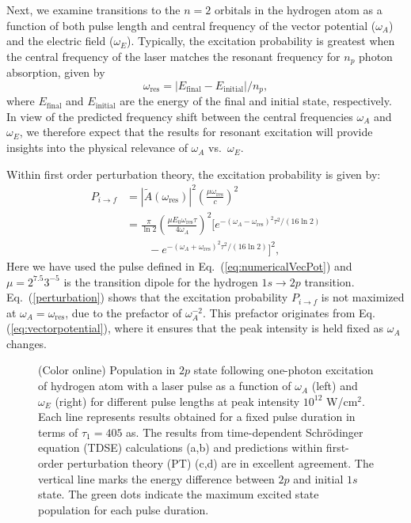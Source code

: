 Next, we examine transitions to the $n=2$ orbitals in the hydrogen atom as a function of both pulse length and central frequency of the vector potential ($\omega_A$) and the electric field ($\omega_E$).
Typically, the excitation probability is greatest when the central frequency of the laser matches the resonant frequency for $n_p$ photon absorption, given by
\begin{equation}
\omega_{\text{res}} = |E_\text{final} - E_\text{initial}|/n_p,
\end{equation}
where $E_\text{final}$ and $E_\text{initial}$ are the energy of the final and initial state, respectively. In view of the predicted frequency shift between the central frequencies $\omega_A$ and $\omega_E$, we therefore expect that the results for resonant excitation will provide insights into the physical relevance of $\omega_A$ vs.~$\omega_E$.

Within first order perturbation theory, the excitation probability is given by:
\begin{equation}
\begin{split}
P_{i\rightarrow f}&= |\tilde{A}(\omega_\text{res})|^2\left(\frac{\mu\omega_\text{res}}{c}\right)^2 \\
&=\frac{\pi}{\ln{2}}\left(\frac{\mu E_0\omega_\text{res}\tau}{4\omega_A}\right)^2
\Big[e^{-(\omega_A-\omega_\text{res})^2\tau^2/(16\ln{2})}\\
&\qquad -
e^{-(\omega_A+\omega_\text{res})^2\tau^2/(16\ln{2})}
\Big]^2,
\end{split}
\label{perturbation}
\end{equation}
Here we have used the pulse defined in Eq.~(\ref{eq:numericalVecPot}) and $\mu=2^{7.5}3^{-5}$ is the transition dipole for the hydrogen $1s\rightarrow 2p$ transition. Eq.~(\ref{perturbation}) shows that the excitation probability $P_{i\rightarrow f}$ is not maximized at  $\omega_A=\omega_\text{res}$, due to the prefactor of $\omega_A^{-2}$. This prefactor originates from Eq. (\ref{eq:vectorpotential}), where it ensures that the peak intensity is held fixed as $\omega_A$ changes.

\begin{figure}[t]
\centering
\caption{(Color online)
Population in $2p$ state following one-photon excitation of hydrogen atom with a laser pulse as a function of $\omega_A$ (left) and $\omega_E$ (right) for different pulse lengths at peak intensity $10^{12}$ W/cm$^2$. Each line represents results obtained for a fixed pulse duration in terms of $\tau_1=405$ as. The results from time-dependent Schr\"odinger equation (TDSE) calculations (a,b) and predictions within first-order perturbation theory (PT) (c,d) are in excellent agreement. The vertical line marks the energy difference between $2p$ and initial $1s$ state. The green dots indicate the maximum excited state population for each pulse duration. 
}
  \label{fig:h-excited_2p}
\end{figure}


